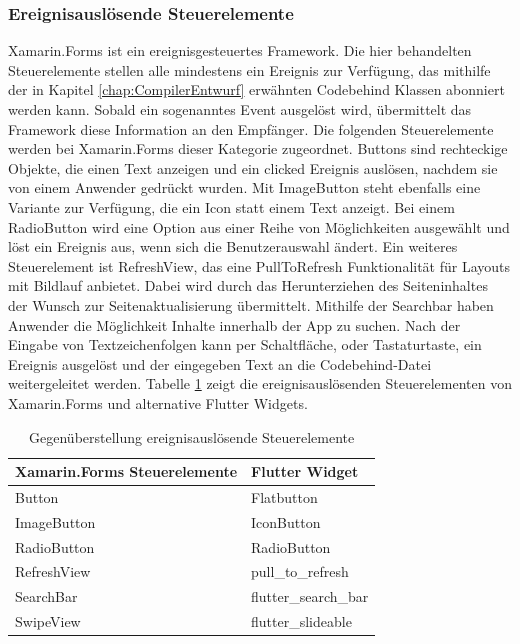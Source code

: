 \subsubsection{Ereignisauslösende Steuerelemente}
Xamarin.Forms ist ein ereignisgesteuertes Framework. Die hier behandelten Steuerelemente stellen alle mindestens ein Ereignis zur Verfügung,  das mithilfe der in Kapitel \ref{chap:CompilerEntwurf} erwähnten Codebehind Klassen abonniert werden kann.  Sobald ein  sogenanntes Event ausgelöst wird,  übermittelt das Framework diese Information an den Empfänger.   Die folgenden Steuerelemente werden bei Xamarin.Forms dieser Kategorie zugeordnet.  \glq Buttons\grq{} sind rechteckige Objekte,  die einen Text anzeigen und ein \glq clicked\grq{} Ereignis auslösen, nachdem sie von einem Anwender gedrückt wurden.  Mit \glq ImageButton\grq{} steht ebenfalls eine Variante zur Verfügung,  die ein Icon statt einem Text anzeigt.  Bei einem \glq RadioButton\grq{} wird eine Option aus einer Reihe von Möglichkeiten ausgewählt und löst ein Ereignis aus,  wenn sich die Benutzerauswahl ändert.  Ein weiteres Steuerelement ist \glq RefreshView\grq{}, das eine \glq PullToRefresh\grq{}  Funktionalität für Layouts mit Bildlauf anbietet.  Dabei wird durch das Herunterziehen des Seiteninhaltes der Wunsch zur Seitenaktualisierung  übermittelt.  Mithilfe der \glq Searchbar\grq{} haben Anwender die Möglichkeit Inhalte  innerhalb der App zu suchen.  Nach der  Eingabe von Textzeichenfolgen kann per Schaltfläche,  oder Tastaturtaste, ein Ereignis ausgelöst und der eingegeben Text an die Codebehind-Datei weitergeleitet werden.  Tabelle \ref{tab:eventcommands}  zeigt die ereignisauslösenden Steuerelementen von Xamarin.Forms und alternative Flutter Widgets.
\begin{table}[!ht]
\begin{tabularx}{\textwidth}{X|X}
   \textbf{Xamarin.Forms Steuerelemente} & \textbf{Flutter Widget}  \\
\hline
	Button		       				&  	Flatbutton 		\\ 
	ImageButton		       		&  	IconButton 		\\ 
	RadioButton		       		&  	RadioButton 		\\ 
	RefreshView		       		&  	pull\_to\_refresh 		\\ 
	SearchBar		       			&  	flutter\_search\_bar 	\\ 
	SwipeView		       		&  	flutter\_slideable 		\\ 
\end{tabularx}
\caption{Gegenüberstellung ereignisauslösende Steuerelemente}
 \label{tab:eventcommands}
\end{table}

